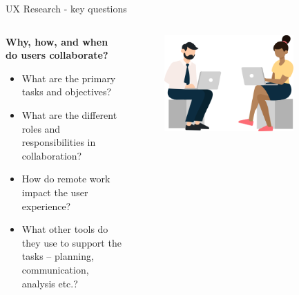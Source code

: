 \documentclass[aspectratio=169]{beamer}
\begin{document}
\begin{frame}{UX Research - key questions}
    \vspace{1em}
    \begin{columns}
        \begin{column}{0.6\textwidth}
            \textbf{Why, how, and when do users collaborate?}\\
            \vspace{1em}
            \begin{itemize}
                \small
                \item What are the primary tasks and objectives?
                \item What are the different roles and responsibilities in collaboration? 
                \item How do remote work impact the user experience?
                \item What other tools do they use to support the tasks -- planning, communication, analysis etc.?
            \end{itemize}
        \end{column}
        \begin{column}{0.4\textwidth}
            \begin{figure}[h]
                \centering
                \includegraphics[width=0.8\textwidth]{images/collaborators.png}
            \end{figure}
        \end{column}
    \end{columns}
    \let\thefootnote\relax{}
\end{frame}
\end{document}
